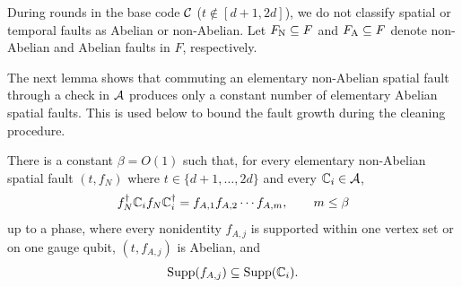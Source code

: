 \documentclass[11pt]{article}
\begin{document}
During rounds in the base code $\mathcal{C}$ ($t\notin [d+1,2d]$), we do not classify spatial or temporal faults as Abelian or non-Abelian. 
Let $F_\mathrm{N}\subseteq F$ and $F_\mathrm{A}\subseteq F$ denote non-Abelian and Abelian faults in $F$, respectively.

The next lemma shows that commuting an elementary non-Abelian spatial fault through a check in $\mathcal{A}$ produces only a constant number of elementary Abelian spatial faults.
This is used below to bound the fault growth during the cleaning procedure.
\begin{lemma}
\label{lem:byproducts}
    There is a constant $\beta = O(1)$ such that, for every elementary non-Abelian spatial fault $(t, f_N)$ where $t\in \{d+1,\dots, 2d\}$ and every $\mathbb{C}_{i}\in \mathcal{A}$, 
    \[
    f^\dagger_N \mathbb{C}_{i} f_N \mathbb{C}_{i}^\dagger = f_{A,1} f_{A,2} \cdots f_{A,m},\qquad m\le \beta
    \]
    up to a phase, where every nonidentity $f_{A,j}$ is supported within one vertex set or on one gauge qubit, $(t,f_{A,j})$ is Abelian, and 
    \[
    \operatorname{Supp}(f_{A,j})\subseteq \operatorname{Supp}(\mathbb{C}_{i}).
    \] 
\end{lemma}
\end{document}
